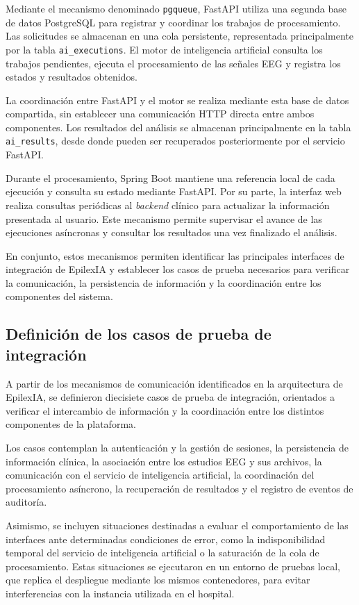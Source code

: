 Mediante el mecanismo denominado \texttt{pgqueue}, FastAPI utiliza una segunda base de datos PostgreSQL para registrar y coordinar los trabajos de procesamiento. Las solicitudes se almacenan en una cola persistente, representada principalmente por la tabla \texttt{ai\_executions}. El motor de inteligencia artificial consulta los trabajos pendientes, ejecuta el procesamiento de las señales EEG y registra los estados y resultados obtenidos.

La coordinación entre FastAPI y el motor se realiza mediante esta base de datos compartida, sin establecer una comunicación HTTP directa entre ambos componentes. Los resultados del análisis se almacenan principalmente en la tabla \texttt{ai\_results}, desde donde pueden ser recuperados posteriormente por el servicio FastAPI.

Durante el procesamiento, Spring Boot mantiene una referencia local de cada ejecución y consulta su estado mediante FastAPI. Por su parte, la interfaz web realiza consultas periódicas al \textit{backend} clínico para actualizar la información presentada al usuario. Este mecanismo permite supervisar el avance de las ejecuciones asíncronas y consultar los resultados una vez finalizado el análisis.

En conjunto, estos mecanismos permiten identificar las principales interfaces de integración de EpilexIA y establecer los casos de prueba necesarios para verificar la comunicación, la persistencia de información y la coordinación entre los componentes del sistema.


\subsection{Definición de los casos de prueba de integración}
\label{subsec:casos_pruebas_integracion}

A partir de los mecanismos de comunicación identificados en la arquitectura de EpilexIA, se definieron diecisiete casos de prueba de integración, orientados a verificar el intercambio de información y la coordinación entre los distintos componentes de la plataforma.

Los casos contemplan la autenticación y la gestión de sesiones, la persistencia de información clínica, la asociación entre los estudios EEG y sus archivos, la comunicación con el servicio de inteligencia artificial, la coordinación del procesamiento asíncrono, la recuperación de resultados y el registro de eventos de auditoría.

Asimismo, se incluyen situaciones destinadas a evaluar el comportamiento de las interfaces ante determinadas condiciones de error, como la indisponibilidad temporal del servicio de inteligencia artificial o la saturación de la cola de procesamiento. Estas situaciones se ejecutaron en un entorno de pruebas local, que replica el despliegue mediante los mismos contenedores, para evitar interferencias con la instancia utilizada en el hospital.

